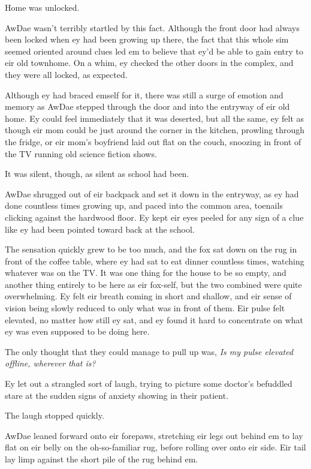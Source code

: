 Home was unlocked.

AwDae wasn't terribly startled by this fact. Although the front door had always been locked when ey had been growing up there, the fact that this whole sim seemed oriented around clues led em to believe that ey'd be able to gain entry to eir old townhome. On a whim, ey checked the other doors in the complex, and they were all locked, as expected.

Although ey had braced emself for it, there was still a surge of emotion and memory as AwDae stepped through the door and into the entryway of eir old home. Ey could feel immediately that it was deserted, but all the same, ey felt as though eir mom could be just around the corner in the kitchen, prowling through the fridge, or eir mom's boyfriend laid out flat on the couch, snoozing in front of the TV running old science fiction shows.

It was silent, though, as silent as school had been.

AwDae shrugged out of eir backpack and set it down in the entryway, as ey had done countless times growing up, and paced into the common area, toenails clicking against the hardwood floor. Ey kept eir eyes peeled for any sign of a clue like ey had been pointed toward back at the school.

The sensation quickly grew to be too much, and the fox sat down on the rug in front of the coffee table, where ey had sat to eat dinner countless times, watching whatever was on the TV. It was one thing for the house to be so empty, and another thing entirely to be here as eir fox-self, but the two combined were quite overwhelming. Ey felt eir breath coming in short and shallow, and eir sense of vision being slowly reduced to only what was in front of them. Eir pulse felt elevated, no matter how still ey sat, and ey found it hard to concentrate on what ey was even supposed to be doing here.

The only thought that they could manage to pull up was, \emph{Is my pulse elevated offline, wherever that is?}

Ey let out a strangled sort of laugh, trying to picture some doctor's befuddled stare at the sudden signs of anxiety showing in their patient.

The laugh stopped quickly.

AwDae leaned forward onto eir forepaws, stretching eir legs out behind em to lay flat on eir belly on the oh-so-familiar rug, before rolling over onto eir side. Eir tail lay limp against the short pile of the rug behind em.

